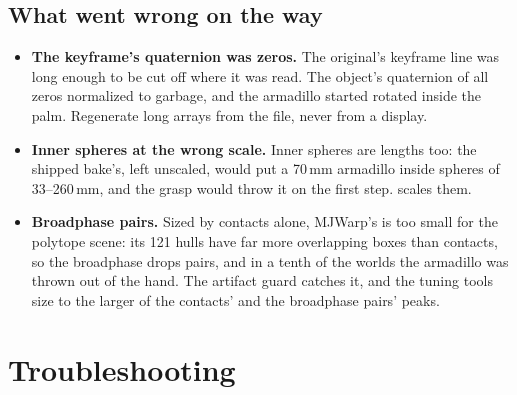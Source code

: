 \subsection{What went wrong on the way}\label{sec:extrouble}

\begin{itemize}
\item \textbf{The keyframe's quaternion was zeros.} The original's keyframe line was long enough to be cut off where it was read. The object's quaternion of all zeros normalized to garbage, and the armadillo started rotated inside the palm. Regenerate long arrays from the file, never from a display.
\item \textbf{Inner spheres at the wrong scale.} Inner spheres are lengths too: the shipped bake's, left unscaled, would put a 70\,mm armadillo inside spheres of 33--260\,mm, and the grasp would throw it on the first step.  scales them.
\item \textbf{Broadphase pairs.} Sized by contacts alone, MJWarp's  is too small for the polytope scene: its 121 hulls have far more overlapping boxes than contacts, so the broadphase drops pairs, and in a tenth of the worlds the armadillo was thrown out of the hand. The artifact guard catches it, and the tuning tools size  to the larger of the contacts' and the broadphase pairs' peaks.
\end{itemize}

\section{Troubleshooting}\label{sec:trouble}

